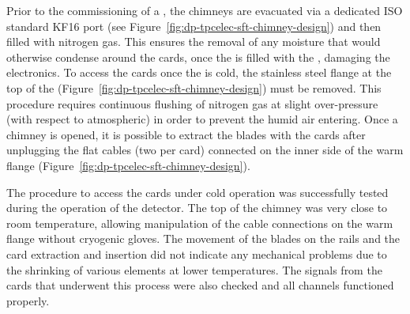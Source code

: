Prior to the commissioning of a , the chimneys are evacuated via a dedicated ISO standard KF16 port (see Figure~\ref{fig:dp-tpcelec-sft-chimney-design}) and then filled with nitrogen gas. This ensures the removal of %
any moisture that would otherwise condense around the  cards, once the  is filled with the \lar, damaging the electronics. To access the  cards once the  is cold, the stainless steel flange at the top of the  (Figure~\ref{fig:dp-tpcelec-sft-chimney-design}) must be removed. This procedure requires continuous flushing of nitrogen gas at slight over-pressure (with respect to atmospheric) in order to prevent the humid air entering. %
Once a chimney is opened, it is possible to extract the blades with the  cards after unplugging the flat cables (two per card) connected on the inner side of the warm flange (Figure~\ref{fig:dp-tpcelec-sft-chimney-design}).

The procedure to access the  cards under cold operation was successfully tested during the operation of the  detector. The %
top of the chimney was very close to room temperature, allowing manipulation of the cable connections on the warm \fdth flange without %
cryogenic gloves. The movement of the blades on the rails and the  card extraction and insertion did not indicate any mechanical problems %
due to the shrinking of various elements %
at lower temperatures.  The signals from the  cards that underwent %
this process were also checked and %
all channels functioned properly.



